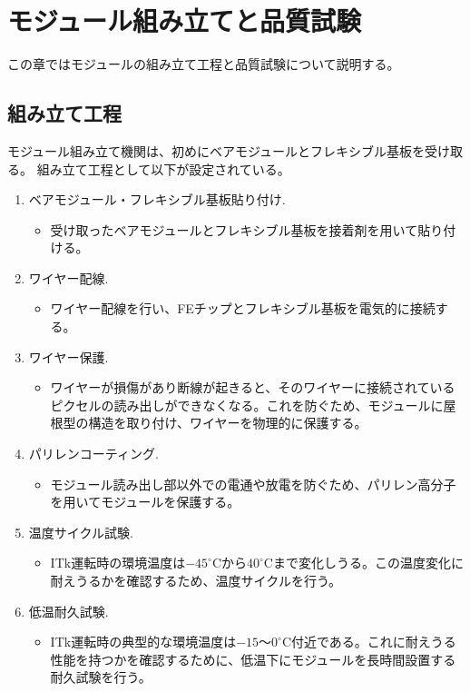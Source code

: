 \chapter{モジュール組み立てと品質試験} \label{chap:qc_test}
この章ではモジュールの組み立て工程と品質試験について説明する。

\section{組み立て工程}\label{sec:assembly}
モジュール組み立て機関は、初めにベアモジュールとフレキシブル基板を受け取る。
組み立て工程として以下が設定されている。
\begin{enumerate}
  \item ベアモジュール・フレキシブル基板貼り付け.
  \begin{itemize}
    \item 受け取ったベアモジュールとフレキシブル基板を接着剤を用いて貼り付ける。
  \end{itemize}
  \item ワイヤー配線.
  \begin{itemize}
    \item ワイヤー配線を行い、FEチップとフレキシブル基板を電気的に接続する。
  \end{itemize}
  \item ワイヤー保護.
  \begin{itemize}
    \item ワイヤーが損傷があり断線が起きると、そのワイヤーに接続されているピクセルの読み出しができなくなる。これを防ぐため、モジュールに屋根型の構造を取り付け、ワイヤーを物理的に保護する。
  \end{itemize}
  \item パリレンコーティング.
  \begin{itemize}
    \item モジュール読み出し部以外での電通や放電を防ぐため、パリレン高分子を用いてモジュールを保護する。
  \end{itemize}
  \item 温度サイクル試験.
  \begin{itemize}
    \item ITk運転時の環境温度は$-45^\circ$Cから$40^\circ$Cまで変化しうる\cite{3-2}。この温度変化に耐えうるかを確認するため、温度サイクルを行う。
  \end{itemize}
  \item 低温耐久試験.
  \begin{itemize}
    \item ITk運転時の典型的な環境温度は$-15〜0^\circ$C付近である。これに耐えうる性能を持つかを確認するために、低温下にモジュールを長時間設置する耐久試験を行う。
  \end{itemize}
\end{enumerate}

